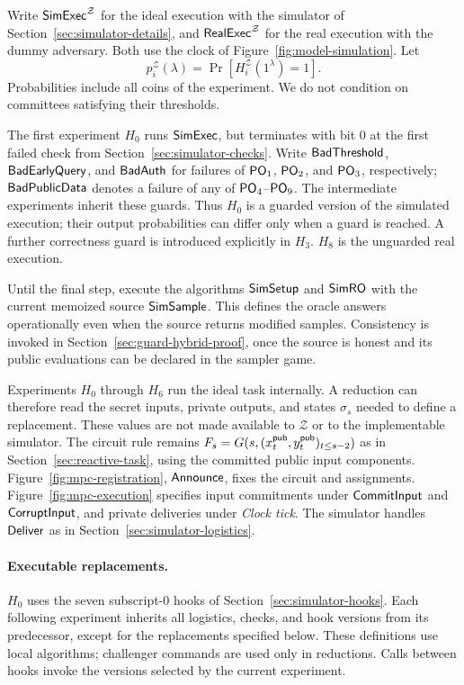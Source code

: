 Write $\mathsf{SimExec}^{\mathcal Z}$ for the ideal execution with the simulator
of Section~\ref{sec:simulator-details}, and $\mathsf{RealExec}^{\mathcal Z}$ for the real
execution with the dummy adversary.  Both use the clock of
Figure~\ref{fig:model-simulation}.  Let
\[
 p_i^{\mathcal Z}(\lambda)=\Pr[H_i^{\mathcal Z}(1^\lambda)=1].
\]
Probabilities include all coins of the experiment.  We do not condition
on committees satisfying their thresholds.

The first experiment $H_0$ runs $\mathsf{SimExec}$, but terminates with bit $0$
at the first failed check from Section~\ref{sec:simulator-checks}.
Write $\mathsf{BadThreshold}$, $\mathsf{BadEarlyQuery}$, and $\mathsf{BadAuth}$ for failures
of $\mathsf{PO}_{1}$, $\mathsf{PO}_{2}$, and $\mathsf{PO}_{3}$, respectively; $\mathsf{BadPublicData}$
denotes a failure of any of $\mathsf{PO}_{4}$--$\mathsf{PO}_{9}$.
The intermediate experiments inherit these guards.  Thus $H_0$ is a
guarded version of the simulated execution; their output probabilities
can differ only when a guard is reached.  A further correctness guard
is introduced explicitly in $H_3$.  $H_8$ is the unguarded real execution.

Until the final step, execute the algorithms $\mathsf{SimSetup}$ and $\mathsf{SimRO}$
with the current memoized source $\mathsf{SimSample}$.  This defines the oracle
answers operationally even when the source returns modified samples.
Consistency is invoked in Section~\ref{sec:guard-hybrid-proof}, once
the source is honest and its public evaluations can be declared in the
sampler game.

Experiments $H_0$ through $H_6$ run the ideal task internally.  A
reduction can therefore read the secret inputs, private outputs, and
states $\sigma_s$ needed to define a replacement.  These values are not
made available to $\mathcal Z$ or to the implementable simulator.
The circuit rule remains
$F_s=G(s,(x^{\mathsf{pub}}_t,y^{\mathsf{pub}}_t)_{t\leq s-2})$ as in
Section~\ref{sec:reactive-task}, using the committed public input
components.  Figure~\ref{fig:mpc-registration}, $\mathsf{Announce}$, fixes the
circuit and assignments.  Figure~\ref{fig:mpc-execution} specifies input
commitments under $\mathsf{CommitInput}$ and $\mathsf{CorruptInput}$, and private deliveries
under \emph{Clock tick}.  The simulator handles $\mathsf{Deliver}$ as in
Section~\ref{sec:simulator-logistics}.

\paragraph{Executable replacements.}
$H_0$ uses the seven subscript-$0$ hooks of
Section~\ref{sec:simulator-hooks}.  Each following experiment inherits
all logistics, checks, and hook versions from its predecessor, except
for the replacements specified below.  These definitions use local
algorithms; challenger commands are used only in reductions.  Calls
between hooks invoke the versions selected by the current experiment.

